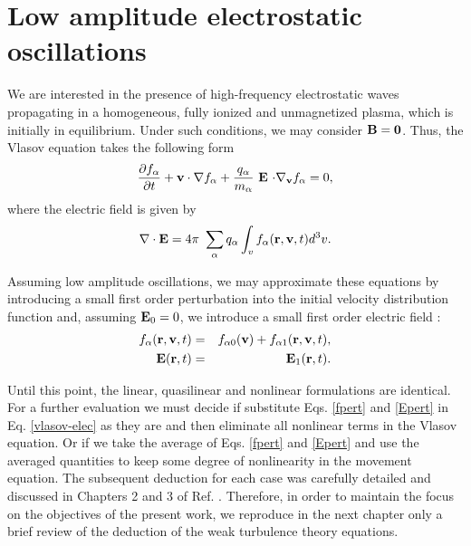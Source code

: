 \documentclass[12pt,a4paper,ruledheader]{report}
\begin{document}
\section{Low amplitude electrostatic oscillations}
We are interested in the presence of high-frequency electrostatic
waves propagating in a homogeneous, fully ionized and unmagnetized
plasma, which is initially in equilibrium. Under such conditions,
we may consider ${\bf B=0}$. Thus, the Vlasov equation takes the
following form
\begin{equation}
  \label{vlasov-elec}
  \frac{\partial f_\alpha}{\partial t}+{\bf v \cdot \nabla}f_\alpha
+\frac{q_{\alpha}}{m_\alpha}\ {\bf E}\ {\bf\cdot \nabla_v}f_\alpha=0,
\end{equation}
where the electric field is given by
\begin{equation}
{\bf \nabla \cdot E}  = 4\pi\ \sum_\alpha q_\alpha 
\int_v  f_\alpha({\bf r},{\bf v},t) d^3v.
\label{leidegauss}
\end{equation}

Assuming low amplitude oscillations, we may approximate these equations
by introducing a small first order perturbation into the initial velocity
distribution function and, assuming ${\bf E}_0=0$, we introduce a small
first order electric field :
\begin{eqnarray}
  \label{fpert}
  f_{\alpha}({\bf r}, {\bf v},t)&=&f_{\alpha0}({\bf v})
	    +f_{\alpha1}({\bf r}, {\bf v},t),\\
  {\bf E}({\bf r},t)&=&{\bf E}_1({\bf r},t).
\label{Epert}
\end{eqnarray}

Until this point, the linear, quasilinear and nonlinear formulations
are identical. For a further evaluation we must decide if substitute
Eqs. \eqref{fpert} and \eqref{Epert} in Eq. \eqref{vlasov-elec} as they
are and then eliminate all nonlinear terms in the Vlasov equation. Or if
we take the average of Eqs. \eqref{fpert} and \eqref{Epert} and use the
averaged quantities to keep some degree of nonlinearity in the movement
equation. The subsequent deduction for each case was carefully detailed
and discussed in Chapters 2 and 3 of Ref. \cite{Tigik2015}. Therefore,
in order to maintain the focus on the objectives of the present work, we
reproduce in the next chapter only a brief review of the deduction of
the weak turbulence theory equations. 
\end{document}
